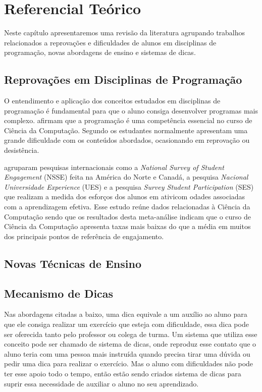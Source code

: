 \chapter{Referencial Teórico}

Neste capítulo apresentaremos uma revisão da literatura agrupando trabalhos relacionados a reprovações e dificuldades de alunos em disciplinas de programação, novas abordagens de ensino e sistemas de dicas. 

\section{Reprovações em Disciplinas de Programação}

O entendimento e aplicação dos conceitos estudados em disciplinas de programação é fundamental para que o aluno consiga desenvolver programas mais complexo.  afirmam que a programação é uma competência essencial no curso de Ciência da Computação. Segundo  os estudantes normalmente apresentam uma grande dificuldade com os conteúdos abordados, ocasionando em reprovação ou desistência.

 agruparam pesquisas internacionais como a \textit{National Survey of Student Engagement} (NSSE) feita na América do Norte e Canadá, a pesquisa \textit{Nacional Universidade Experience} (UES) e a pesquisa \textit{Survey Student Participation} (SES) que realizam a medida dos esforços dos alunos em ativicom odades associadas com a aprendizagem efetiva. Esse estudo reúne dados relacionadas à Ciência da Computação sendo que os resultados desta meta-análise indicam que o curso de Ciência da Computação apresenta taxas mais baixas do que a média em muitos dos principais pontos de referência de engajamento.

\section{Novas Técnicas de Ensino}

\section{Mecanismo de Dicas}

Nas abordagens citadas a baixo, uma dica equivale a um auxílio ao aluno para que ele consiga realizar um exercício que esteja com dificuldade, essa dica pode ser oferecida tanto pelo professor ou colega de turma. Um sistema que utiliza esse conceito pode ser chamado de sistema de dicas, onde reproduz esse contato que o aluno teria com uma pessoa mais instruída quando precisa tirar uma dúvida ou pedir uma dica para realizar o exercício. Mas o aluno com dificuldades não pode ter esse apoio todo o tempo, então estão sendo criados sistema de dicas para suprir essa necessidade de auxiliar o aluno no seu aprendizado.

